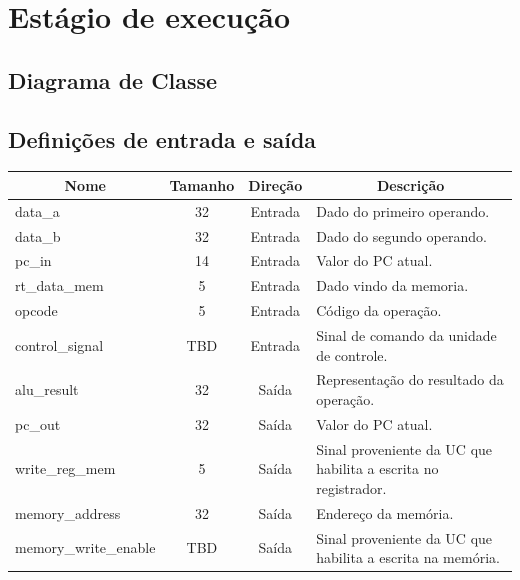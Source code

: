 \section{Estágio de execução}
	\subsection{Diagrama de Classe}
  \begin{figure}[h]
    
  \end{figure}
		
		\subsection{Definições de entrada e saída}
		
	\begin{center}
		\begin{longtable}[pos]{| l | c | c | m{7cm} |} \hline
			\multicolumn{1}{|c|}{\cellcolor[gray]{0.9}\textbf{Nome}} & 
			\multicolumn{1}{c|}{\cellcolor[gray]{0.9}\textbf{Tamanho}} & 
			\multicolumn{1}{c|}{\cellcolor[gray]{0.9}\textbf{Direção}} &
			\multicolumn{1}{c|}{\cellcolor[gray]{0.9}\textbf{Descrição}} \\ \hline
			\endhead
			\hline
			\endlastfoot


			data\_a & 32 & Entrada & Dado do primeiro operando. \\ \hline
			data\_b & 32 & Entrada & Dado do segundo operando. \\ \hline
			pc\_in & 14 & Entrada & Valor do PC atual. \\ \hline
			rt\_data\_mem & 5 & Entrada & Dado vindo da memoria. \\ \hline
			opcode & 5 & Entrada & Código da operação.\\ \hline
			control\_signal & TBD & Entrada & Sinal de comando da unidade de controle. \\ \hline
			alu\_result & 32 & Saída & Representação do resultado da operação. \\ \hline
			pc\_out & 32 & Saída & Valor do PC atual. \\ \hline
			write\_reg\_mem & 5 & Saída & Sinal proveniente da UC que habilita a escrita no registrador. \\ \hline
			memory\_address & 32 & Saída & Endereço da memória. \\ \hline
			memory\_write\_enable & TBD & Saída & Sinal proveniente da UC que habilita a escrita na memória.

			
		\end{longtable}
	\end{center}
	
